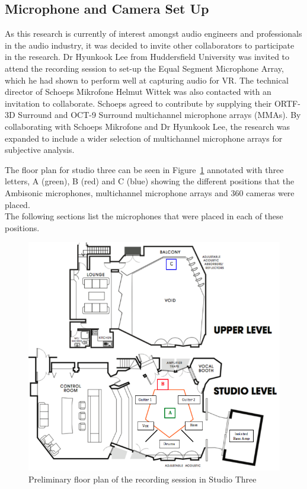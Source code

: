 	\subsection{Microphone and Camera Set Up}

		As this research is currently of interest amongst audio engineers and professionals in the audio industry, it was decided to invite other collaborators to participate in the research. Dr Hyunkook Lee from Huddersfield University was invited to attend the recording session to set-up the Equal Segment Microphone Array, which he had shown to perform well at capturing audio for VR. The technical director of Schoeps Mikrofone Helmut Wittek was also contacted with an invitation to collaborate. Schoeps agreed to contribute by supplying their ORTF-3D Surround and OCT-9 Surround multichannel microphone arrays (MMAs). By collaborating with Schoeps Mikrofone and Dr Hyunkook Lee, the research was expanded to include a wider selection of multichannel microphone arrays for subjective analysis. 

		The floor plan for studio three can be seen in Figure~\ref{FloorPlan} annotated with three letters, A (green), B (red) and C (blue) showing the different positions that the Ambisonic microphones, multichannel microphone arrays and 360\textdegree{} cameras were placed. \\



		 The following sections list the microphones that were placed in each of these positions.

		\begin{figure}
			\begin{center}
				\includegraphics[width = 0.8\linewidth]{images/other/FloorPlan.png}
				\caption{Preliminary floor plan of the recording session in Studio Three \cite{Studio3}}
				\label{FloorPlan}
			\end{center}
		\end{figure}

